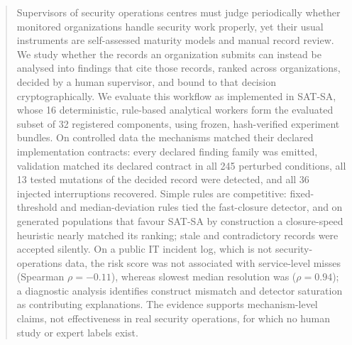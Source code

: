 \begin{abstract}
Supervisors of security operations centres must judge periodically whether monitored
organizations handle security work properly, yet their usual instruments are
self-assessed maturity models and manual record review. We study whether the records
an organization submits can instead be analysed into findings that cite those
records, ranked across organizations, decided by a human supervisor, and bound to that
decision cryptographically. We evaluate this workflow as implemented in SAT-SA, whose
16 deterministic, rule-based analytical workers form the evaluated subset
of 32 registered components, using frozen, hash-verified experiment
bundles. On controlled data the mechanisms matched their declared implementation contracts: every declared finding
family was emitted, validation matched its declared contract in all 245
perturbed conditions, all 13 tested mutations of the decided record were
detected, and all 36 injected interruptions recovered. Simple rules are
competitive: fixed-threshold and median-deviation rules tied the fast-closure
detector, and on generated populations that favour SAT-SA by construction a
closure-speed heuristic nearly matched its ranking; stale and contradictory records
were accepted silently. On a public IT incident log, which is not security-operations
data, the risk score was not associated with service-level misses (Spearman
$\rho=\ensuremath{-}0.11$), whereas slowest median resolution was
($\rho=0.94$); a diagnostic analysis identifies construct mismatch
and detector saturation as contributing explanations. The evidence supports mechanism-level claims, not
effectiveness in real security operations, for which no human study or expert labels
exist.

\end{abstract}
